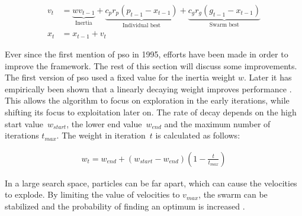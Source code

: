 \begin{align} 
v_{t} &= \underbrace{wv_{t-1}}_\text{Inertia} + \underbrace{c_pr_p(p_{t-1} - x_{t-1})}_\text{Individual best} + \underbrace{c_gr_g(g_{t-1} - x_{t-1})}_\text{Swarm best} \label{eq:velocity_update}\\
x_{t} &= x_{t-1} + v_{t} \label{eq:position_update}
\end{align}

Ever since the first mention of \gls{pso} in 1995, efforts have been made in order to improve the framework. The rest of this section will discuss some improvements.\\

The first version of \gls{pso} used a fixed value for the inertia weight $w$. Later it has empirically been shown that a linearly decaying weight improves performance \cite{pso_study}. This allows the algorithm to focus on exploration in the early iterations, while shifting its focus to exploitation later on. The rate of decay depends on the high start value~$w_{start}$, the lower end value~$w_{end}$ and the maximum number of iterations $t_{max}$. The weight in iteration~$t$ is calculated as follows:

\begin{align}
w_t = w_{end} + (w_{start} - w_{end})\left(1 - \frac{t}{t_{max}}\right) \label{eq:weight}
\end{align}

In a large search space, particles can be far apart, which can cause the velocities to explode. By limiting the value of velocities to $v_{max}$, the swarm can be stabilized and the probability of finding an optimum is increased \cite{pso}.\\

